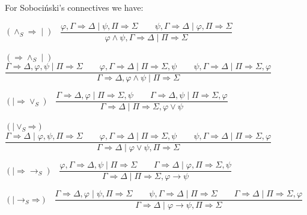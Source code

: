 \documentclass[10pt,a4paper]{article}
\theoremstyle{definition}
\newcommand{\3}{\vspace{.3in}}
\newcommand{\2}{\vspace{.2in}}
\newcommand{\1}{\vspace{.1in}}
\newcommand{\5}{\vspace{.05in}}
\begin{document}
\1

For Soboci\'nski's connectives we have:

\begin{flushleft}
	$(\mathord{\wedge_S\Rightarrow}\mid)$ \ $\dfrac{\varphi, \Gamma
		\Rightarrow \Delta \mid \psi, \Pi\Rightarrow\Sigma \qquad \psi, \Gamma\Rightarrow\Delta \mid \varphi, \Pi\Rightarrow\Sigma}{\varphi\wedge\psi, \Gamma\Rightarrow\Delta \mid \Pi\Rightarrow\Sigma}$
\end{flushleft} 

\begin{flushleft}
	{\footnotesize $(\mathord{\Rightarrow\wedge_S}\mid)$ \ $\dfrac{\Gamma
			\Rightarrow \Delta, \varphi, \psi \mid \Pi\Rightarrow\Sigma \qquad\varphi, \Gamma\Rightarrow\Delta \mid
			\Pi \Rightarrow \Sigma, \psi \qquad \psi, \Gamma\Rightarrow\Delta \mid \Pi\Rightarrow\Sigma, \varphi } {\Gamma
			\Rightarrow \Delta, \varphi\wedge\psi \mid \Pi\Rightarrow\Sigma}$}
	
\end{flushleft}
\begin{flushleft}
	$(\mathord{\mid\Rightarrow}\mathord{\vee_S})$ \ $\dfrac{\Gamma
		\Rightarrow \Delta, \varphi \mid \Pi\Rightarrow\Sigma, \psi \qquad \Gamma\Rightarrow\Delta, \psi\mid \Pi\Rightarrow\Sigma, \varphi}{\Gamma\Rightarrow\Delta \mid \Pi\Rightarrow\Sigma, \varphi\vee\psi}$
\end{flushleft} 

\begin{flushleft}
	{\footnotesize $(\mathord{\mid \vee_S}\mathord{\Rightarrow})$ \ $\dfrac{\Gamma
			\Rightarrow \Delta \mid \varphi, \psi, \Pi\Rightarrow\Sigma \qquad\varphi,  \Gamma\Rightarrow\Delta \mid
			\Pi \Rightarrow \Sigma, \psi \qquad \psi, \Gamma\Rightarrow\Delta \mid \Pi\Rightarrow\Sigma, \varphi } {\Gamma
			\Rightarrow \Delta \mid \varphi\vee\psi, \Pi\Rightarrow\Sigma}$}
\end{flushleft}

\begin{flushleft}
	$(\mathord{\mid\Rightarrow}\mathord{\rightarrow_S})$ \ $\dfrac{\varphi, \Gamma
		\Rightarrow \Delta, \psi \mid \Pi\Rightarrow\Sigma \qquad \Gamma\Rightarrow\Delta \mid \varphi, \Pi\Rightarrow\Sigma, \psi}{\Gamma\Rightarrow\Delta \mid \Pi\Rightarrow\Sigma, \varphi\rightarrow\psi}$
\end{flushleft} 

\begin{flushleft}
	{\small $(\mathord{\mid \rightarrow_S}\mathord{\Rightarrow})$ \ $\dfrac{\Gamma
			\Rightarrow \Delta, \varphi \mid \psi, \Pi\Rightarrow\Sigma \qquad\psi, \Gamma\Rightarrow\Delta \mid
			\Pi \Rightarrow \Sigma \qquad \Gamma\Rightarrow\Delta \mid \Pi\Rightarrow\Sigma, \varphi} {\Gamma
			\Rightarrow \Delta \mid \varphi\rightarrow\psi, \Pi\Rightarrow\Sigma}$}
\end{flushleft}
\end{document}
